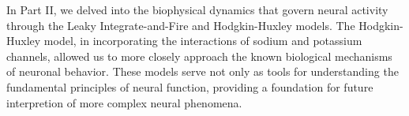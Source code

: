 \documentclass{article}
\begin{document}
In Part II, we delved into the biophysical dynamics that govern neural activity through the Leaky Integrate-and-Fire and Hodgkin-Huxley models. The Hodgkin-Huxley model, in incorporating the interactions of sodium and potassium channels, allowed us to more closely approach the known biological mechanisms of neuronal behavior. These models serve not only as tools for understanding the fundamental principles of neural function, providing a foundation for future interpretion of more complex neural phenomena.
\end{document}
